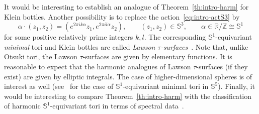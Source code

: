 \documentclass{amsart}
\theoremstyle{plain}
\theoremstyle{definition}
\theoremstyle{remark}
\begin{document}
It would be interesting to establish an analogue of Theorem~\ref{th:intro-harm}
for Klein bottles. Another possibility is to replace the
action~\eqref{eq:intro-actS3} by
\[
\alpha\cdot (z_1,z_2)=(e^{2\pi ik\alpha}z_1,e^{2\pi il\alpha}z_2),\qquad
(z_1,z_2)\in\mathbb S^3,\qquad
\alpha\in\mathbb R/\mathbb Z\cong\mathbb S^1
\]
for some positive relatively prime integers \(k,l\). The corresponding \(\mathbb
S^1\)-equivariant \emph{minimal} tori and Klein bottles are called \emph{Lawson
\(\tau\)-surfaces}~\cite{Law1970,HL1971,Pen2012}. Note that, unlike Otsuki tori,
the Lawson \(\tau\)-surfaces are given by elementary functions. It is reasonable
to expect that the harmonic analogues of Lawson \(\tau\)-surfaces (if they
exist) are given by elliptic integrals. The case of higher-dimensional spheres
is of interest as well (see~\cite{Pen2015} for the case of \(\mathbb
S^1\)-equivariant minimal tori in \(\mathbb S^5\)). Finally, it would be
interesting to compare Theorem~\ref{th:intro-harm} with the classification of
harmonic \(\mathbb S^1\)-equivariant tori in terms of spectral
data~\cite{CO2020}.



\end{document}
